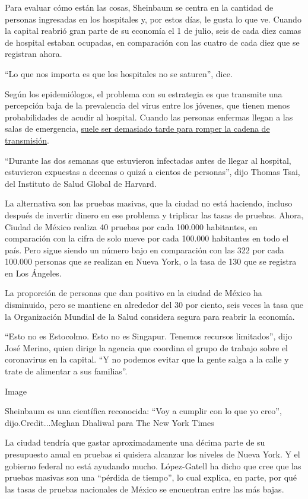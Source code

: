 Para evaluar cómo están las cosas, Sheinbaum se centra en la cantidad de
personas ingresadas en los hospitales y, por estos días, le gusta lo que
ve. Cuando la capital reabrió gran parte de su economía el 1 de julio,
seis de cada diez camas de hospital estaban ocupadas, en comparación con
las cuatro de cada diez que se registran ahora.

``Lo que nos importa es que los hospitales no se saturen'', dice.

Según los epidemiólogos, el problema con su estrategia es que transmite
una percepción baja de la prevalencia del virus entre los jóvenes, que
tienen menos probabilidades de acudir al hospital. Cuando las personas
enfermas llegan a las salas de emergencia,
\href{https://www.nytimes3xbfgragh.onion/es/2020/08/10/espanol/america-latina/mexico-covid-hospitales.html}{suele
ser demasiado tarde para romper la cadena de transmisión}.

``Durante las dos semanas que estuvieron infectadas antes de llegar al
hospital, estuvieron expuestas a decenas o quizá a cientos de
personas'', dijo Thomas Tsai, del Instituto de Salud Global de Harvard.

La alternativa son las pruebas masivas, que la ciudad no está haciendo,
incluso después de invertir dinero en ese problema y triplicar las tasas
de pruebas. Ahora, Ciudad de México realiza 40 pruebas por cada 100.000
habitantes, en comparación con la cifra de solo nueve por cada 100.000
habitantes en todo el país. Pero sigue siendo un número bajo en
comparación con las 322 por cada 100.000 personas que se realizan en
Nueva York, o la tasa de 130 que se registra en Los Ángeles.

La proporción de personas que dan positivo en la ciudad de México ha
disminuido, pero se mantiene en alrededor del 30 por ciento, seis veces
la tasa que la Organización Mundial de la Salud considera segura para
reabrir la economía.

``Esto no es Estocolmo. Esto no es Singapur. Tenemos recursos
limitados'', dijo José Merino, quien dirige la agencia que coordina el
grupo de trabajo sobre el coronavirus en la capital. ``Y no podemos
evitar que la gente salga a la calle y trate de alimentar a sus
familias''.

Image

Sheinbaum es una científica reconocida: ``Voy a cumplir con lo que yo
creo'', dijo.Credit...Meghan Dhaliwal para The New York Times

La ciudad tendría que gastar aproximadamente una décima parte de su
presupuesto anual en pruebas si quisiera alcanzar los niveles de Nueva
York. Y el gobierno federal no está ayudando mucho. López-Gatell ha
dicho que cree que las pruebas masivas son una ``pérdida de tiempo'', lo
cual explica, en parte, por qué las tasas de pruebas nacionales de
México se encuentran entre las más bajas.


